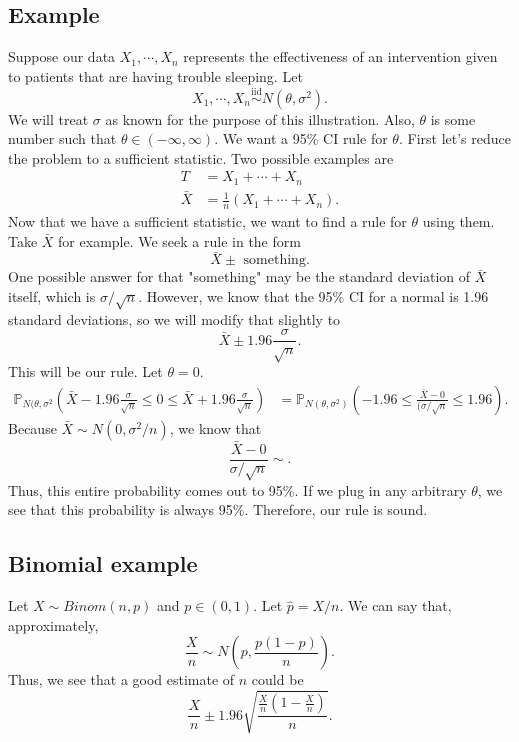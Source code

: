 \documentclass[titlepage, 12pt, leqno]{article}
\begin{document}
\subsection{Example}
Suppose our data $X_{1}, \cdots , X_{n}$ represents the effectiveness of an
intervention given to patients that are having trouble sleeping. Let
\[
X_{1}, \cdots , X_{n} \overset{\mathrm{iid}}{\sim} N(\theta,\sigma^{2}).
\]
We will treat $\sigma$ as known for the purpose of this illustration. Also,
$\theta$ is some number such that $\theta \in (-\infty, \infty)$. We want a
95\% CI rule for $\theta$. First let's reduce the problem to a sufficient 
statistic. Two possible examples are
\begin{align*}
    T &= X_{1} + \cdots  + X_{n}\\
    \bar X &= \frac{1}{n}(X_{1} + \cdots +X_{n}).
\end{align*}
Now that we have a sufficient statistic, we want to find a rule for $\theta$ 
using them. Take $\bar X$ for example. We seek a rule in the form
\[
    \bar X \pm \text{ something}.
\]
One possible answer for that "something" may be the standard deviation of
$\bar X$ itself, which is $\sigma/\sqrt{n}$. However, we know that the 
95\% CI for a normal is 1.96 standard deviations, so we will modify that
slightly to
\[
    \bar X \pm 1.96\frac{\sigma}{\sqrt{n}}.
\]
This will be our rule. Let $\theta=0$.
\begin{align*}
    \mathbb{P}_{N(\theta,\sigma^{2}}\left(\bar X - 1.96\frac{\sigma}{\sqrt{n}}
        \le 0 \le\bar X + 1.96\frac{\sigma}{\sqrt{n}}\right)
    &= \mathbb{P}_{N(\theta,\sigma^{2})}\left(-1.96 \le \frac{\bar X-0}{
        (\sigma/\sqrt{n}}\le 1.96\right).
\end{align*}
Because $\bar X \sim N(0,\sigma^{2}/n)$, we know that
\[
\frac{\bar X -0}{\sigma/\sqrt{n}} \sim .
\]
Thus, this entire probability comes out to 95\%. If we plug in any arbitrary
$\theta$, we see that this probability is always 95\%. Therefore, our
rule is sound.

\subsection{Binomial example}

Let $X \sim  Binom(n,p)$ and $p \in (0,1)$. Let $\hat p = X/n$. We can say
that, approximately,
\[
    \frac{X}{n} \sim N\left(p, \frac{p(1-p)}{n}\right).
\]
Thus, we see that a good estimate of $n$ could be
\[
\frac{X}{n} \pm 1.96 \sqrt{\frac{\frac{X}{n}\left(1-\frac{X}{n}\right)}{n}}.
\]
\end{document}
